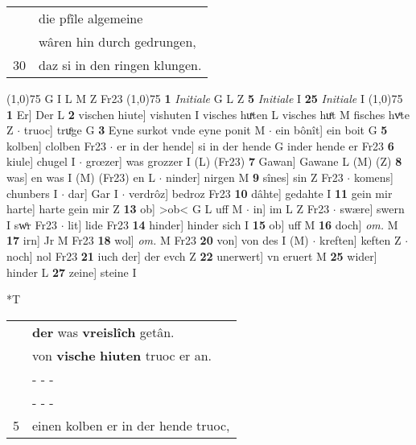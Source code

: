 \documentclass[8pt,a4paper,notitlepage]{article}
\begin{document}
\begin{table}[ht]
\begin{minipage}[t]{0.5\linewidth}
\begin{tabular}{rl}
 & die pfîle algemeine\\ 
 & wâren hin durch gedrungen,\\ 
30 & daz si in den ringen klungen.\\ 
\end{tabular}
\scriptsize
\line(1,0){75} \newline
G I L M Z Fr23 \newline
\line(1,0){75} \newline
\textbf{1} \textit{Initiale} G L Z  \textbf{5} \textit{Initiale} I  \textbf{25} \textit{Initiale} I  \newline
\line(1,0){75} \newline
\textbf{1} Er] Der L \textbf{2} vischen hiute] vishuten I visches huͯten L visches huͤt M fisches hvͤte Z  $\cdot$ truoc] truͦge G \textbf{3} Eyne surkot vnde eyne ponit M  $\cdot$ ein bônît] ein boit G \textbf{5} kolben] clolben Fr23  $\cdot$ er in der hende] si in der hende G inder hende er Fr23 \textbf{6} kiule] chugel I  $\cdot$ grœzer] was grozzer I (L) (Fr23) \textbf{7} Gawan] Gawane L (M) (Z) \textbf{8} was] en was I (M) (Fr23) en L  $\cdot$ ninder] nirgen M \textbf{9} sînes] sin Z Fr23  $\cdot$ komens] chunbers I  $\cdot$ dar] Gar I  $\cdot$ verdrôz] bedroz Fr23 \textbf{10} dâhte] gedahte I \textbf{11} gein mir harte] harte gein mir Z \textbf{13} ob] >ob< G L uff M  $\cdot$ in] im L Z Fr23  $\cdot$ swære] swern I swͦr Fr23  $\cdot$ lit] lide Fr23 \textbf{14} hinder] hinder sich I \textbf{15} ob] uff M \textbf{16} doch] \textit{om.} M \textbf{17} irn] Jr M Fr23 \textbf{18} wol] \textit{om.} M Fr23 \textbf{20} von] von des I (M)  $\cdot$ kreften] keften Z  $\cdot$ noch] nol Fr23 \textbf{21} iuch der] der evch Z \textbf{22} unerwert] vn eruert M \textbf{25} wider] hinder L \textbf{27} zeine] steine I \newline
\end{minipage}
\hspace{0.5cm}
\begin{minipage}[t]{0.5\linewidth}
\small
\begin{center}*T
\end{center}
\begin{tabular}{rl}
 & \textbf{der} was \textbf{vreislîch} getân.\\ 
 & von \textbf{vische} \textbf{hiuten} truoc er an.\\ 
 & \multicolumn{1}{l}{ - - - }\\ 
 & \multicolumn{1}{l}{ - - - }\\ 
5 & einen kolben er in der hende truoc,\\ 

\end{tabular}
\end{minipage}
\end{table}
\end{document}
